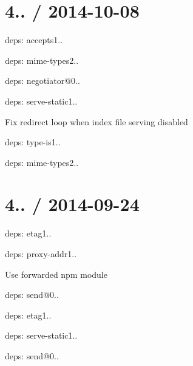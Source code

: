 {\ttfamily \section*{4.. / 2014-\/10-\/08 }}

{\ttfamily }

{\ttfamily 
\begin{DoxyItemize}
\item deps\+: accepts1..
\begin{DoxyItemize}
\item deps\+: mime-\/types2..
\item deps\+: negotiator@0..
\end{DoxyItemize}
\item deps\+: serve-\/static1..
\begin{DoxyItemize}
\item Fix redirect loop when index file serving disabled
\end{DoxyItemize}
\item deps\+: type-\/is1..
\begin{DoxyItemize}
\item deps\+: mime-\/types2..
\end{DoxyItemize}
\end{DoxyItemize}}

{\ttfamily \section*{4.. / 2014-\/09-\/24 }}

{\ttfamily }

{\ttfamily 
\begin{DoxyItemize}
\item deps\+: etag1..
\item deps\+: proxy-\/addr1..
\begin{DoxyItemize}
\item Use {\ttfamily forwarded} npm module
\end{DoxyItemize}
\item deps\+: send@0..
\begin{DoxyItemize}
\item deps\+: etag1..
\end{DoxyItemize}
\item deps\+: serve-\/static1..
\begin{DoxyItemize}
\item deps\+: send@0..
\end{DoxyItemize}
\end{DoxyItemize}}

